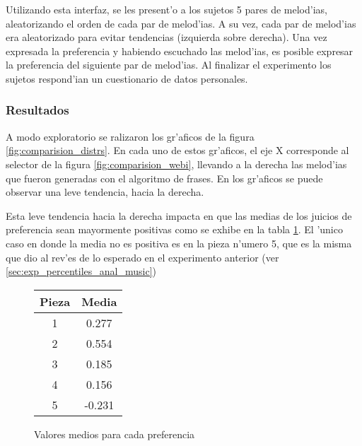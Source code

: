 \begin{imagen}
    \width{13cm}
\end{imagen}

Utilizando esta interfaz, se les present'o a los sujetos 5 pares de melod'ias, aleatorizando el orden de cada par de melod'ias.
A su vez, cada par de melod'ias era aleatorizado para evitar tendencias (izquierda sobre derecha). 
Una vez expresada la preferencia y habiendo escuchado las melod'ias, es posible expresar la preferencia del siguiente par de 
melod'ias. Al finalizar el experimento los sujetos respond'ian un cuestionario de datos personales.

\subsubsection{Resultados}
A modo exploratorio se ralizaron los gr'aficos de la figura \ref{fig:comparision_distrs}. En cada uno de estos gr'aficos, el eje X 
corresponde al selector de la figura \ref{fig:comparision_webi}, llevando a la derecha las melod'ias que fueron generadas
con el algoritmo de frases. En los gr'aficos se puede observar una leve tendencia, hacia la derecha. 

Esta leve tendencia hacia la derecha impacta en que las medias de los juicios de preferencia sean mayormente positivas como se exhibe en la tabla 
\ref{fig:comparision_means}. El 'unico caso en donde la media no es positiva es en la pieza n'umero 5, que es la misma que dio al rev'es de lo 
esperado en el experimento anterior (ver \ref{sec:exp_percentiles_anal_music})

\begin{figure}[htp]
    \begin{center}
        \begin{tabular}{cc}
        Pieza & Media \\
        \hline 
        1		&		0.277   \\
        2		&		0.554   \\
        3		&		0.185   \\
        4		&		0.156   \\
        5		&		-0.231   \\


        \end{tabular}
        \caption{Valores medios para cada preferencia}
        \label{fig:comparision_means}
    \end{center}      
\end{figure}


